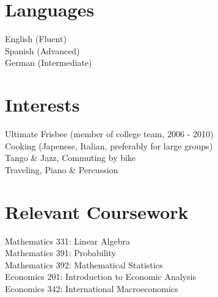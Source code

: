 \documentclass[margin,line]{resume}
\begin{document}
\begin{resume}
    \section{\mysidestyle Languages}
English (Fluent) \\
Spanish (Advanced)\\
German (Intermediate)   %
    \section{\mysidestyle Interests} 

Ultimate Frisbee (member of college team, 2006 - 2010) \\
Cooking (Japenese, Italian, preferably for large groups) \\
Tango \& Jazz, Commuting by bike \\
Traveling, Piano \& Percussion 

\section{\mysidestyle Relevant Coursework}
Mathematics 331: Linear Algebra \\
Mathematics 391: Probability \\
Mathematics 392: Mathematical Statistics \\
Economics 201: Introduction to Economic Analysis \\
Economics 342: International Macroeconomics \\











\end{resume}
\end{document}

